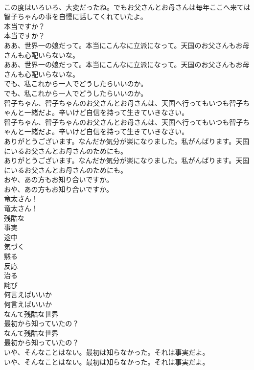\documentclass[8pt]{extreport}
\begin{document}
\begin{CJK}{UTF8}{min}
\\	この度はいろいろ、大変だったね。でもお父さんとお母さんは毎年ここへ来ては智子ちゃんの事を自慢に話してくれていたよ。 
\\	本当ですか？	
\\	本当ですか？ 
\\	ああ、世界一の娘だって。本当にこんなに立派になって。天国のお父さんもお母さんも心配いらないな。	
\\	ああ、世界一の娘だって。本当にこんなに立派になって。天国のお父さんもお母さんも心配いらないな。 
\\	でも、私これから一人でどうしたらいいのか。	
\\	でも、私これから一人でどうしたらいいのか。 
\\	智子ちゃん、智子ちゃんのお父さんとお母さんは、天国へ行ってもいつも智子ちゃんと一緒だよ。辛いけど自信を持って生きていきなさい。	
\\	智子ちゃん、智子ちゃんのお父さんとお母さんは、天国へ行ってもいつも智子ちゃんと一緒だよ。辛いけど自信を持って生きていきなさい。 
\\	ありがとうございます。なんだか気分が楽になりました。私がんばります。天国にいるお父さんとお母さんのためにも。	
\\	ありがとうございます。なんだか気分が楽になりました。私がんばります。天国にいるお父さんとお母さんのためにも。 
\\	おや、あの方もお知り合いですか。	
\\	おや、あの方もお知り合いですか。 
\\	竜太さん！	
\\	竜太さん！ 
\\	残酷な
\\	事実
\\	途中
\\	気づく
\\	黙る
\\	反応
\\	治る
\\	詫び
\\	何言えばいいか
\\	何言えばいいか
\\	なんて残酷な世界
\\	最初から知っていたの？	
\\	なんて残酷な世界
\\	最初から知っていたの？ 
\\	いや、そんなことはない。最初は知らなかった。それは事実だよ。	
\\	いや、そんなことはない。最初は知らなかった。それは事実だよ。 

\end{CJK}
\end{document}
